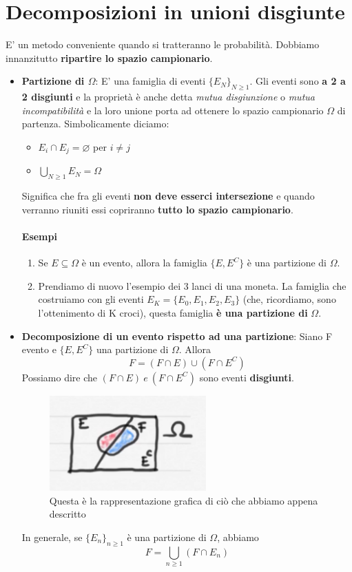 \documentclass{report}
\begin{document}
\section{Decomposizioni in unioni disgiunte}
E' un metodo conveniente quando si tratteranno le probabilità. Dobbiamo innanzitutto \textbf{ripartire lo spazio campionario}.
\begin{itemize}
    \item \textbf{Partizione di \(\Omega\)}: E' una famiglia di eventi \(\{E_N\}_{N\geq1}\). Gli eventi sono \textbf{a 2 a 2 disgiunti} e la proprietà è anche detta \textit{mutua disgiunzione} o \textit{mutua incompatibilità} e la loro unione porta ad ottenere lo spazio campionario \(\Omega\) di partenza. Simbolicamente diciamo:
    \begin{itemize}
        \item \(E_i \cap E_j = \varnothing\) per \(i \neq j\)
        \item \(\bigcup_{N\geq 1} E_N = \Omega\)
    \end{itemize}
    Significa che fra gli eventi \textbf{non deve esserci intersezione} e quando verranno riuniti essi copriranno \textbf{tutto lo spazio campionario}.

\paragraph{Esempi} \begin{enumerate}
    \item Se \(E \subseteq \Omega\) è un evento, allora la famiglia \(\{E, E^C\}\) è una partizione di \(\Omega\).
    \item Prendiamo di nuovo l'esempio dei 3 lanci di una moneta. La famiglia che costruiamo con gli eventi \(E_K = \{E_0,E_1,E_2,E_3\}\) (che, ricordiamo, sono l'ottenimento di K croci), questa famiglia \textbf{è una partizione di} \(\Omega\).
\end{enumerate}
\item \textbf{Decomposizione di un evento rispetto ad una partizione}: Siano F evento e \(\{E, E^C\}\) una partizione di \(\Omega\). Allora \[F = (F \cap E) \cup (F\cap E^C)\] Possiamo dire che \((F \cap E)\ e\ (F\cap E^C)\) sono eventi \textbf{disgiunti}.
\clearpage
\begin{figure}[hb]
    \centering
    \includegraphics[width = 6cm]{EventiDisgiuntiinOmega.png}
    \caption{Questa è la rappresentazione grafica di ciò che abbiamo appena descritto}
    \label{fig:EventiDisgiunti}
\end{figure}
In generale, se \(\{E_n\}_{n\geq 1}\) è una partizione di \(\Omega\), abbiamo \[F = \bigcup_{n\geq 1} (F \cap E_n)\]


\end{itemize}
\end{document}

